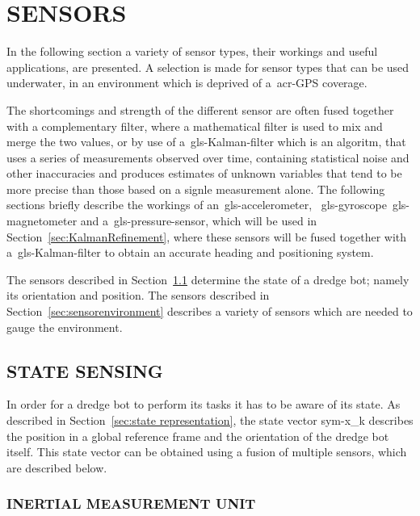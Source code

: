 

\section{SENSORS}\label{sec:sensors}

In the following section a variety of sensor types, their workings and useful applications, are presented. A 
selection is
made for sensor types that can be used underwater, in an environment which is deprived of a~\gls{acr-GPS} coverage.

The shortcomings and strength of the different sensor are often fused together with a complementary filter, where a 
mathematical filter is used to mix and merge the two values, or by use of a~\gls{gls-Kalman-filter} which is an 
algoritm, that uses a series of measurements observed over time, containing statistical noise and other inaccuracies 
and produces estimates of unknown variables that tend to be more precise than those based on a signle measurement 
alone. The following sections briefly describe the workings of an~\gls{gls-accelerometer}, 
~\gls{gls-gyroscope}~\gls{gls-magnetometer} and a~\gls{gls-pressure-sensor}, which will be used in 
Section~\ref{sec:KalmanRefinement}, where these sensors will be fused together with a~\gls{gls-Kalman-filter} to 
obtain an accurate heading and positioning system.

The sensors described in Section~\ref{sec:sensorstate} determine the state of a dredge bot; namely its orientation and
position. The sensors described in Section~\ref{sec:sensorenvironment} describes a variety of sensors which are needed
to gauge the environment.

\subsection{STATE SENSING}\label{sec:sensorstate}

In order for a dredge bot to perform its tasks it has to be aware of its state. As described in 
Section~\ref{sec:state representation}, the state vector \gls{sym-x_k} describes the position in a global reference 
frame and the orientation of the dredge bot itself. This state vector can be obtained using a fusion of multiple 
sensors, which are described below.

\subsubsection{INERTIAL MEASUREMENT UNIT}

